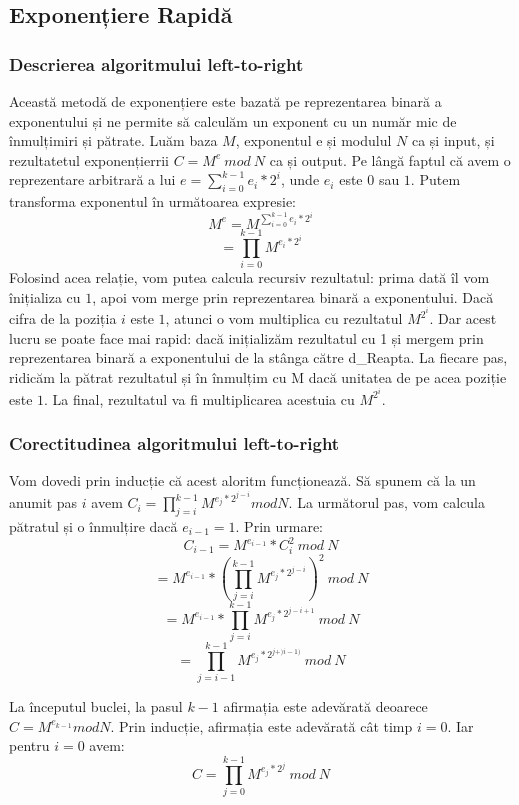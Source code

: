\documentclass[12]{report}
\begin{document}
     \subsection{Exponențiere Rapidă}
      \subsubsection{Descrierea algoritmului left-to-right}
       Această metodă de exponențiere este bazată pe reprezentarea binară a exponentului și ne permite să calculăm un exponent cu un număr mic de înmulțimiri și pătrate. Luăm baza $M$, exponentul e și modulul $N$ ca și input, și rezultatetul exponențierrii $C = M^e \ mod \ N$ ca și output. Pe lângă faptul că avem o reprezentare arbitrară a lui $ e = \sum_{i=0} ^ {k-1} e_i * 2^i $, unde $ e_i $ este $0$ sau $1$. Putem transforma exponentul în următoarea expresie: \\
       $$ M^e = M^{\sum_{i=0} ^ {k-1} e_i * 2^i} $$ 
       $$ =  \prod_{i=0}^{k-1} M^{e_i*2^i} $$ 
       Folosind acea relație, vom putea calcula recursiv rezultatul: prima dată îl vom înițializa cu $1$, apoi vom merge prin reprezentarea binară a exponentului. Dacă cifra de la poziția $i$ este $1$, atunci o vom multiplica cu rezultatul $ M^{2^i}$. Dar acest lucru se poate face mai rapid: dacă inițializăm rezultatul cu 1 și mergem prin reprezentarea binară a exponentului de la stânga către d_Reapta. La fiecare pas, ridicăm la pătrat rezultatul și în înmulțim cu M dacă unitatea de pe acea poziție este $1$. La final, rezultatul va fi multiplicarea acestuia cu $ M^{2^i}$.
      \subsubsection{Corectitudinea algoritmului left-to-right}
      Vom dovedi prin inducție că acest aloritm funcționează. Să spunem că la un anumit pas $i$ avem $ C_i = \prod_{j=i}^{k-1} {M^{e_j*2^{j-i}}} mod N$. La următorul pas, vom calcula pătratul și o înmulțire dacă $ e_{i-1} = 1 $. Prin urmare: \\
      $$ C_{i-1} = M^{e_{i-1}}*C_{i}^2 \ mod \ N$$
      $$ = M^{e_{i-1}} * \left( \prod_{j=i}^{k-1} M^{e_j*2^{j-i}} \right)^2 \ mod \ N $$
      $$ = M^{e_{i-1}} * \prod_{j=i}^{k-1} M^{e_j*2^{j-i+1}} \ mod \ N$$
      $$ = \prod_{j=i-1}^{k-1} M^{e_j*2^{j+)i-1)}} \ mod \ N $$
      
      La începutul buclei, la pasul $ k-1 $ afirmația este adevărată deoarece $ C = M^{e_{k-1}} mod N$. Prin inducție, afirmația este adevărată cât timp $ i=0$. Iar pentru $i=0$ avem: \\
      $$ C= \prod_{j=0}^{k-1} M^{e_j * 2^j}  \ mod \ N $$
      
\end{document}
